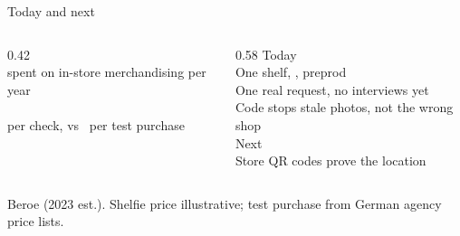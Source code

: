 \begin{frame}{Today and next}
  \begin{columns}[T]
    \begin{column}{0.42\textwidth}\centering
      {\fontsize{28}{32}\selectfont\bfseries\color{cardano}\MarketServices}\\[0.1em]
      {\scriptsize spent on in-store merchandising per year}\\[0.8em]
      {\fontsize{22}{26}\selectfont\bfseries\color{cardano}\PricePerStore}\\[0.1em]
      {\scriptsize per check, vs \CostPerVisit\ per test purchase}
    \end{column}
    \begin{column}{0.58\textwidth}\small
      \alert{Today}\\
      One shelf, \City, preprod\\
      One real request, no interviews yet\\
      Code stops stale photos, not the wrong shop\\[0.6em]
      \alert{Next}\\
      Store QR codes prove the location
    \end{column}
  \end{columns}
  \vfill
  {\centering\tiny Beroe (2023 est.). Shelfie price illustrative; test purchase from German agency price lists.\par}
\end{frame}
